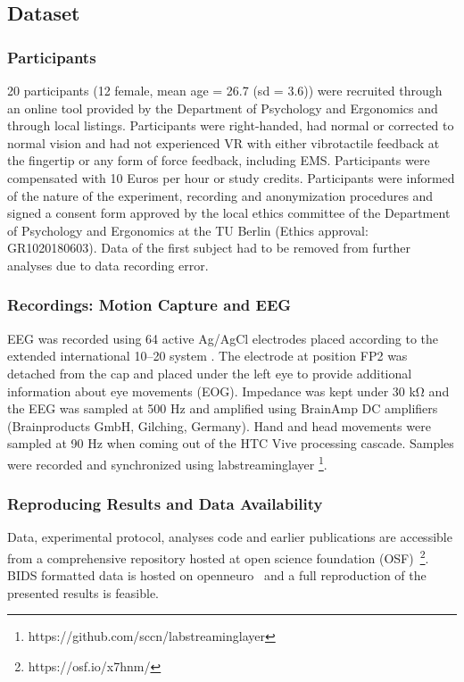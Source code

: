 \subsection{Dataset}
\subsubsection{Participants}
20 participants (12 female, mean age = 26.7 (sd = 3.6)) were recruited through an online tool provided by the Department of Psychology and Ergonomics and through local listings. Participants were right-handed, had normal or corrected to normal vision and had not experienced VR with either vibrotactile feedback at the fingertip or any form of force feedback, including EMS. Participants were compensated with 10 Euros per hour or study credits. Participants were informed of the nature of the experiment, recording and anonymization procedures and signed a consent form approved by the local ethics committee of the Department of Psychology and Ergonomics at the TU Berlin (Ethics approval: GR1020180603). Data of the first subject had to be removed from further analyses due to data recording error. 


\subsubsection{Recordings: Motion Capture and EEG}
EEG was recorded using 64 active Ag/AgCl electrodes placed according to the extended international 10–20 system \cite{Chatrian1985a}. The electrode at position FP2 was detached from the cap and placed under the left eye to provide additional information about eye movements (EOG). Impedance was kept under 30 \si{\kohm} and the EEG was sampled at 500 Hz and amplified using BrainAmp DC amplifiers (Brainproducts GmbH, Gilching, Germany). Hand and head movements were sampled at 90 Hz when coming out of the HTC Vive processing cascade. Samples were recorded and synchronized using labstreaminglayer \footnote{https://github.com/sccn/labstreaminglayer}.

\subsubsection{Reproducing Results and Data Availability}
Data, experimental protocol, analyses code and earlier publications are accessible from a comprehensive repository hosted at open science foundation (OSF)~\footnote{https://osf.io/x7hnm/}. BIDS formatted data is hosted on openneuro~\cite{ds003552} and a full reproduction of the presented results is feasible.

